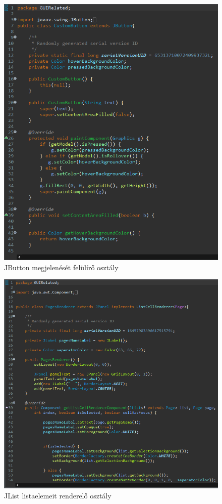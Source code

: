 \begin{figure}[h]
	\centering
	\includegraphics[scale=0.3]{images/package_guirelated_jbutton_details.png}
	\caption{JButton megjelenését felülírő osztály}
	\label{fig:package_guirelated_jbutton}
\end{figure}
\begin{figure}[h]
	\centering
	\includegraphics[scale=0.3]{images/package_guirelated_jlistrenderer_details.png}
	\caption{JList listaelemeit renderelő osztály}
	\label{fig:package_guirelated_jlistrenderer}
\end{figure}
